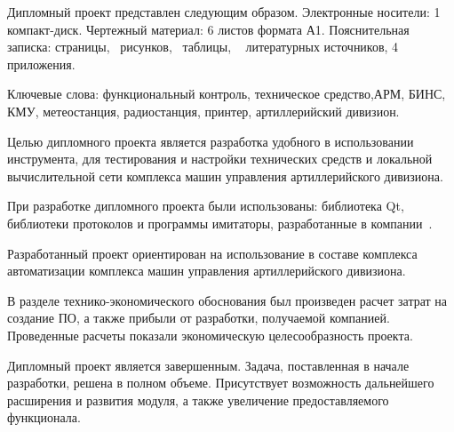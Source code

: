 \thispagestyle{empty}

Дипломный проект представлен следующим образом. Электронные
носители: 1 компакт-диск. Чертежный материал: 6 листов формата А1.
Пояснительная записка: \pageref*{LastPage} страницы, \totfig{}~рисунков, \tottab{}~таблицы, \totref{}~
литературных источников, 4 приложения.

Ключевые слова: функциональный контроль, техническое средство,\break АРМ, БИНС, КМУ, метеостанция, радиостанция, принтер, артиллерийский дивизион.

Целью дипломного проекта является разработка удобного в использовании инструмента, для тестирования и настройки
технических средств и локальной вычислительной сети комплекса машин управления артиллерийского дивизиона.

При разработке дипломного проекта были использованы: библиотека Qt, библиотеки протоколов и программы имитаторы, разработанные в
компании~\company.

Разработанный проект ориентирован на использование в составе комплекса автоматизации комплекса машин управления
артиллерийского дивизиона.

В разделе технико-экономического обоснования был произведен расчет затрат на создание ПО, а также прибыли от разработки,
получаемой компанией.
Проведенные расчеты показали экономическую целесообразность проекта.

Дипломный проект является завершенным. Задача, поставленная в
начале разработки, решена в полном объеме. Присутствует возможность
дальнейшего расширения и развития модуля, а также увеличение
предоставляемого функционала.

\clearpage
